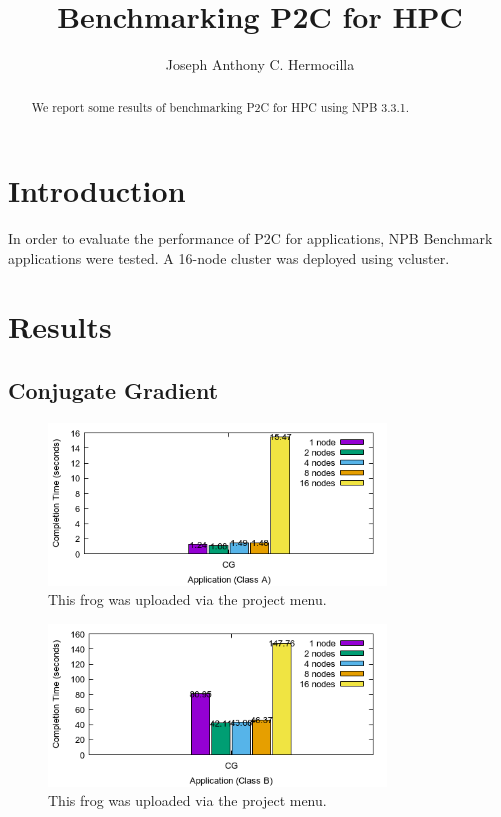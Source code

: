 \documentclass[a4paper]{article}
\title{Benchmarking P2C for HPC}
\author{Joseph Anthony C. Hermocilla}
\begin{document}
\maketitle

\begin{abstract}
We report some results of benchmarking P2C for HPC using NPB 3.3.1.
\end{abstract}

\section{Introduction}
In order to evaluate the performance of P2C for applications, NPB Benchmark applications were tested. A 16-node cluster was deployed using vcluster.

\section{Results}

\subsection{Conjugate Gradient}

\begin{figure}[H]
\centering
\includegraphics[width=0.8\textwidth]{figures/CGvA.png}
\caption{\label{fig:CGvA}This frog was uploaded via the project menu.}
\end{figure}

\begin{figure}[H]
\centering
\includegraphics[width=0.8\textwidth]{figures/CGvB.png}
\caption{\label{fig:CGvB}This frog was uploaded via the project menu.}
\end{figure}
\end{document}
